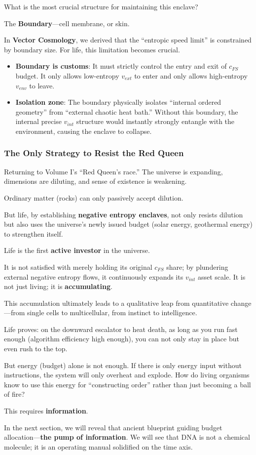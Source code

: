 What is the most crucial structure for maintaining this enclave?

The \textbf{Boundary}---cell membrane, or skin.

In \textbf{Vector Cosmology}, we derived that the ``entropic speed limit'' is constrained by boundary size. For life, this limitation becomes crucial.

\begin{itemize}
\item \textbf{Boundary is customs}: It must strictly control the entry and exit of $c_{FS}$ budget. It only allows low-entropy $v_{ext}$ to enter and only allows high-entropy $v_{env}$ to leave.

\item \textbf{Isolation zone}: The boundary physically isolates ``internal ordered geometry'' from ``external chaotic heat bath.'' Without this boundary, the internal precise $v_{int}$ structure would instantly strongly entangle with the environment, causing the enclave to collapse.
\end{itemize}

\subsubsection{The Only Strategy to Resist the Red Queen}

Returning to Volume I's ``Red Queen's race.'' The universe is expanding, dimensions are diluting, and sense of existence is weakening.

Ordinary matter (rocks) can only passively accept dilution.

But life, by establishing \textbf{negative entropy enclaves}, not only resists dilution but also uses the universe's newly issued budget (solar energy, geothermal energy) to strengthen itself.

Life is the first \textbf{active investor} in the universe.

It is not satisfied with merely holding its original $c_{FS}$ share; by plundering external negative entropy flows, it continuously expands its $v_{int}$ asset scale. It is not just living; it is \textbf{accumulating}.

This accumulation ultimately leads to a qualitative leap from quantitative change---from single cells to multicellular, from instinct to intelligence.

Life proves: on the downward escalator to heat death, as long as you run fast enough (algorithm efficiency high enough), you can not only stay in place but even rush to the top.

But energy (budget) alone is not enough. If there is only energy input without instructions, the system will only overheat and explode. How do living organisms know to use this energy for ``constructing order'' rather than just becoming a ball of fire?

This requires \textbf{information}.

In the next section, we will reveal that ancient blueprint guiding budget allocation---\textbf{the pump of information}. We will see that DNA is not a chemical molecule; it is an operating manual solidified on the time axis.


